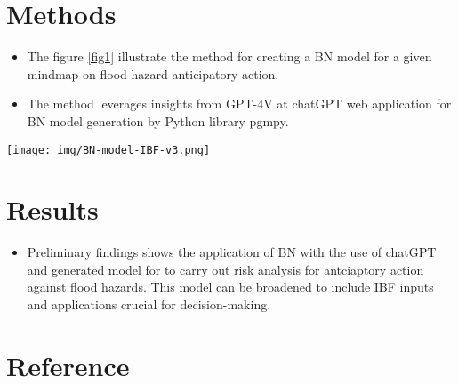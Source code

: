 \documentclass[a0paper,fleqn]{betterposter}
\begin{document}
{		\section{Methods}
		\begin{itemize}
			\item The figure \ref{fig1} illustrate the method for creating a BN model for a given mindmap on flood hazard anticipatory action. 
			\item The method leverages insights from GPT-4V at chatGPT web application for BN model generation by Python library pgmpy.
		\end{itemize}
		\begin{center}
			\texttt{[image: img/BN-model-IBF-v3.png]}
			\label{fig1}
		\end{center}
		
		
	    \section{Results}
		\begin{itemize}
			\item Preliminary findings shows the application of BN with the use of chatGPT and generated model for to carry out risk analysis for antciaptory action against flood hazards. This model can be broadened to include IBF inputs and applications crucial for decision-making.
		\end{itemize}
		\section{Reference}
		\renewcommand{\bibsection}{}                                                                                                               
		
		
	}	
\end{document}
